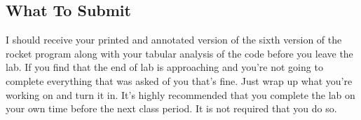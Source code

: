 \documentclass[nobib]{tufte-handout}
\begin{document}
\subsection{What To Submit}

I should receive your printed and annotated version of the sixth version of the rocket program along with your tabular analysis of the code before you leave the lab. If you find that the end of lab is approaching and you're not going to complete everything that was asked of you that's fine. Just wrap up what you're working on and turn it in.  It's highly recommended that you complete the lab on your own time before the next class period. It is not required that you do so.
\end{document}
